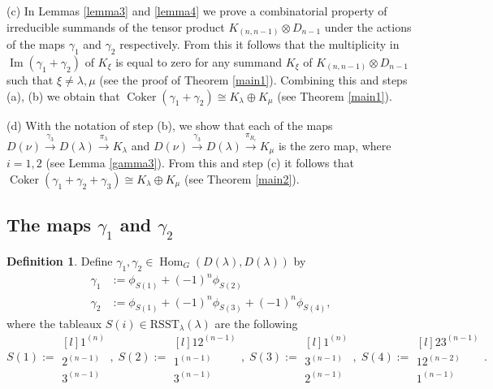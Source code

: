\documentclass[11pt]{amsart}
\theoremstyle{definition}
\newtheorem{defn}[thm]{Definition}
\numberwithin{equation}{section}
\DeclareMathOperator{\Ima}{Im}
\DeclareMathOperator{\Hom}{Hom}
\DeclareMathOperator{\coker}{Coker}
\begin{document}
(c) In Lemmas \ref{lemma3} and \ref{lemma4} we prove a combinatorial property of irreducible summands of  the tensor product $K_{(n,n-1)} \otimes D_{n-1}$ under the actions of the maps $\gamma_1$ and ${\gamma_2}$ respectively. From this it follows that the multiplicity in $\Ima(\gamma_1+\gamma_2)$ of $K_\xi$ is equal to zero for any summand $K_\xi$ of $K_{(n,n-1)} \otimes D_{n-1}$ such that $\xi \neq \lambda, \mu$ (see the proof of Theorem \ref{main1}). Combining this and steps (a), (b) we obtain that $\coker(\gamma_1+\gamma_2) \cong K_\lambda \oplus K_\mu$ (see Theorem \ref{main1}).

(d) With the notation of step (b), we show that each of the maps  $D(\nu) \xrightarrow{\gamma_3} D(\lambda) \xrightarrow{\pi_{\lambda}} K_\lambda$ and $D(\nu) \xrightarrow{\gamma_3} D(\lambda) \xrightarrow{\pi_{R_i}} K_\mu$ is the zero map, where $i=1,2$ (see Lemma \ref{gamma3}). From this and step (c) it follows that $\coker(\gamma_1+\gamma_2+\gamma_3) \cong K_\lambda \oplus K_\mu$ (see Theorem \ref{main2}).
\subsection{The maps $\gamma_1$ and $\gamma_2$}
\begin{defn}\label{mapg} Define $\gamma_1, \gamma_2  \in \Hom _G(D(\lambda), D(\lambda))$ by \begin{align*}\gamma_1 &:= \phi_{S(1)}+ (-1)^n\phi_{S(2)} \\ \gamma_2 &:= \phi_{S(1)}+(-1)^n \phi_{S(3)} +(-1)^n \phi_{S(4)},\end{align*} where the tableaux $S(i) \in \mathrm{RSST}_\lambda(\lambda) $ are the following
	\[ S(1):=\begin{matrix*}[l]
		1^{(n)}  \\
		2^{(n-1)} \\
		3^{(n-1)} \end{matrix*}, \; S(2):=\begin{matrix*}[l]
		12^{(n-1)}  \\
		1^{(n-1)} \\
		3^{(n-1)} \end{matrix*}, \; S(3):=\begin{matrix*}[l]
		1^{(n)}  \\
		3^{(n-1)} \\
		2^{(n-1)} \end{matrix*}, \; S(4):=\begin{matrix*}[l]
		23^{(n-1)}  \\
		12^{(n-2)} \\
		1^{(n-1)} \end{matrix*}. \]	
\end{defn}
\end{document}
